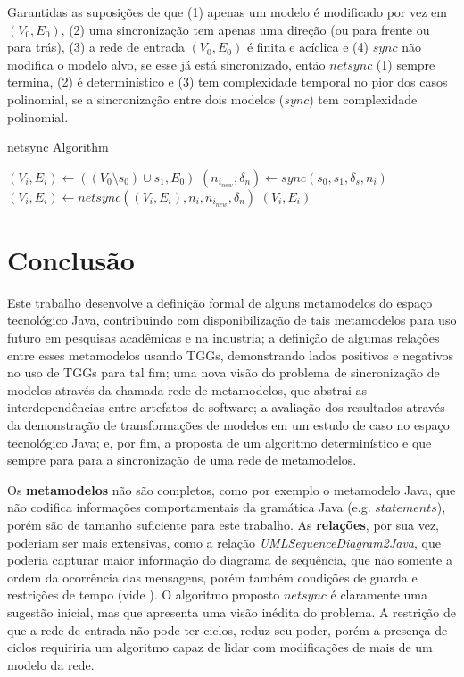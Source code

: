 \documentclass[cic,resumo-unibral]{iiufrgs}
\begin{document}
\begin{extendedsummary}
Garantidas as suposições de que (1) apenas um modelo é modificado por vez em $(V_0,E_0)$, (2) uma sincronização tem apenas uma direção (ou para frente ou para trás), (3) a rede de entrada $(V_0,E_0)$ é finita e acíclica e (4) $sync$ não modifica o modelo alvo, se esse já está sincronizado, então $netsync$ (1) sempre termina, (2) é determinístico e (3) tem complexidade temporal no pior dos casos polinomial, se a sincronização entre dois modelos ($sync$) tem complexidade polinomial.

\begin{algorithm}[H]
	\caption{netsync Algorithm}
	\begin{algorithmic}[1]
		\State $(V_i,E_i) \leftarrow ((V_0 \setminus s_0) \cup s_1, E_0)$ 
			\State $(n_{i_{new}}, \delta_n) \leftarrow sync(s_0, s_1, \delta_s, n_i)$ 
			 
				\State $(V_i,E_i) \leftarrow netsync((V_i,E_i), n_i, n_{i_{new}}, \delta_n)$ 
			\EndIf
		\EndFor
		\State \Return $(V_i, E_i)$
		\EndFunction
	\end{algorithmic}
\end{algorithm}

\section{Conclusão}
Este trabalho desenvolve a definição formal de alguns metamodelos do espaço tecnológico Java, contribuindo com disponibilização de tais metamodelos para uso futuro em pesquisas acadêmicas e na industria; a definição de algumas relações entre esses metamodelos usando TGGs, demonstrando lados positivos e negativos no uso de TGGs para tal fim; uma nova visão do problema de sincronização de modelos através da chamada rede de metamodelos, que abstrai as interdependências entre artefatos de software; a avaliação dos resultados através da demonstração de transformações de modelos em um estudo de caso no espaço tecnológico Java; e, por fim, a proposta de um algoritmo determinístico e que sempre para para a sincronização de uma rede de metamodelos.

Os \textbf{metamodelos} não são completos, como por exemplo o metamodelo Java, que não codifica informações comportamentais da gramática Java (e.g. $statements$), porém são de tamanho suficiente para este trabalho. As \textbf{relações}, por sua vez, poderiam ser mais extensivas, como a relação \textit{UMLSequenceDiagram2Java}, que poderia capturar maior informação do diagrama de sequência, que não somente a ordem da ocorrência das mensagens, porém também condições de guarda e restrições de tempo (vide \citet{omg2007unified}). O algoritmo proposto $netsync$ é claramente uma sugestão inicial, mas que apresenta uma visão inédita do problema. A restrição de que a rede de entrada não pode ter ciclos, reduz seu poder, porém a presença de ciclos requiriria um algoritmo capaz de lidar com modificações de mais de um modelo da rede.
 

\end{extendedsummary}
\end{document}
